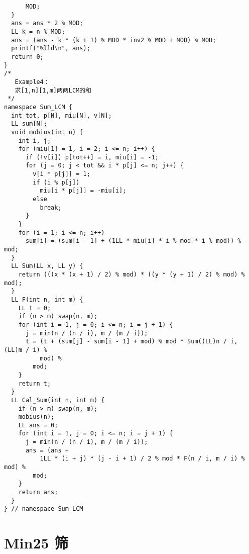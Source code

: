 \begin{lstlisting}
      MOD;
  }
  ans = ans * 2 % MOD;
  LL k = n % MOD;
  ans = (ans - k * (k + 1) % MOD * inv2 % MOD + MOD) % MOD;
  printf("%lld\n", ans);
  return 0;
}
/*
   Example4：
   求[1,n][1,m]两两LCM的和
 */
namespace Sum_LCM {
  int tot, p[N], miu[N], v[N];
  LL sum[N];
  void mobius(int n) {
    int i, j;
    for (miu[1] = 1, i = 2; i <= n; i++) {
      if (!v[i]) p[tot++] = i, miu[i] = -1;
      for (j = 0; j < tot && i * p[j] <= n; j++) {
        v[i * p[j]] = 1;
        if (i % p[j])
          miu[i * p[j]] = -miu[i];
        else
          break;
      }
    }
    for (i = 1; i <= n; i++)
      sum[i] = (sum[i - 1] + (1LL * miu[i] * i % mod * i % mod)) % mod;
  }
  LL Sum(LL x, LL y) {
    return (((x * (x + 1) / 2) % mod) * ((y * (y + 1) / 2) % mod) % mod);
  }
  LL F(int n, int m) {
    LL t = 0;
    if (n > m) swap(n, m);
    for (int i = 1, j = 0; i <= n; i = j + 1) {
      j = min(n / (n / i), m / (m / i));
      t = (t + (sum[j] - sum[i - 1] + mod) % mod * Sum((LL)n / i, (LL)m / i) %
          mod) %
        mod;
    }
    return t;
  }
  LL Cal_Sum(int n, int m) {
    if (n > m) swap(n, m);
    mobius(n);
    LL ans = 0;
    for (int i = 1, j = 0; i <= n; i = j + 1) {
      j = min(n / (n / i), m / (m / i));
      ans = (ans +
          1LL * (i + j) * (j - i + 1) / 2 % mod * F(n / i, m / i) % mod) %
        mod;
    }
    return ans;
  }
} // namespace Sum_LCM

\end{lstlisting}


\section{Min25 筛}

